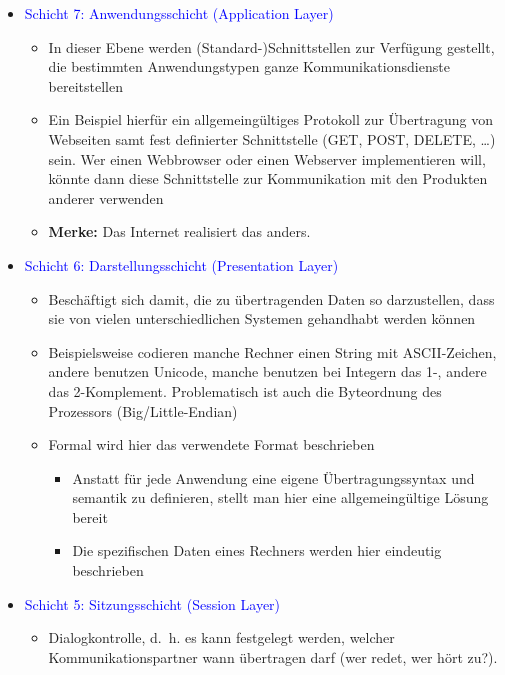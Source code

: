 \begin{itemize}
    \item \textcolor{blue}{Schicht 7: Anwendungsschicht (Application Layer)}
    \begin{itemize}
        \item In dieser Ebene werden (Standard-)Schnittstellen zur Verfügung gestellt, die bestimmten Anwendungstypen ganze Kommunikationsdienste bereitstellen
        \item Ein Beispiel hierfür ein allgemeingültiges Protokoll zur Übertragung von Webseiten samt fest definierter Schnittstelle (GET, POST, DELETE, …) sein.
        Wer einen Webbrowser oder einen Webserver implementieren will, könnte dann diese Schnittstelle zur Kommunikation mit den Produkten anderer verwenden
        \item \textbf{Merke:} Das Internet realisiert das anders.
    \end{itemize}
    \item \textcolor{blue}{Schicht 6: Darstellungsschicht (Presentation Layer)}
    \begin{itemize}
        \item Beschäftigt sich damit, die zu übertragenden Daten so darzustellen, dass sie von vielen unterschiedlichen Systemen gehandhabt werden können
        \item Beispielsweise codieren manche Rechner einen String mit ASCII-Zeichen, andere benutzen Unicode, manche benutzen bei Integern das 1-, andere das 2-Komplement.
        Problematisch ist auch die Byteordnung des Prozessors (Big/Little-Endian)
        \item Formal wird hier das verwendete Format beschrieben
        \begin{itemize}
            \item Anstatt für jede Anwendung eine eigene Übertragungssyntax und \-semantik zu definieren,
            stellt man hier eine allgemeingültige Lösung bereit
            \item Die spezifischen Daten eines Rechners werden hier eindeutig beschrieben
        \end{itemize}
    \end{itemize}
    \item \textcolor{blue}{Schicht 5: Sitzungsschicht (Session Layer)}
    \begin{itemize}
        \item Dialogkontrolle, d.\ h. es kann festgelegt werden, welcher Kommunikationspartner wann übertragen darf (wer redet, wer hört zu?).

\end{itemize}
\end{itemize}
